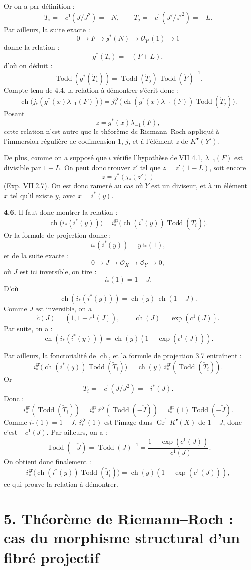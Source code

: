 \documentclass[11pt]{article}
\newcommand{\Gr}{\operatorname{Gr}}
\newcommand{\ch}{\operatorname{ch}}
\newcommand{\Todd}{\operatorname{Todd}}
\providecommand{\ch}{\operatorname{ch}}
\providecommand{\Todd}{\operatorname{Todd}}
\providecommand{\Gr}{\operatorname{Gr}}
\providecommand{\Gr}{\operatorname{G}}
\begin{document}
Or on a par définition :
\[
 T_i=-c^1(J/J^2)=-N,\qquad
 T_j=-c^1(J'/J'^2)=-L.
\]
Par ailleurs, la suite exacte :
\[
0\longrightarrow F\longrightarrow g^*(N)\longrightarrow \mathcal O_{Y'}(1)\longrightarrow0
\]
donne la relation :
\[
 g^*(T_i)=-(F+L),
\]
d'où on déduit :
\[
 \Todd(g^*(\check T_i))=\Todd(\check T_j)\Todd(\check F)^{-1}.
\]
Compte tenu de 4.4, la relation à démontrer s'écrit donc :
\[
 \ch\bigl(j_*(g^*(x)\lambda_{-1}(F))\bigr)
 =
 j^{\mathrm{gr}}_*\bigl(\ch(g^*(x)\lambda_{-1}(F))\Todd(\check T_j)\bigr).
\]
Posant
\[
z=g^*(x)\lambda_{-1}(F),
\]
cette relation n'est autre que le théorème de Riemann--Roch appliqué à l'immersion régulière de codimension \(1\), \(j\), et à l'élément \(z\) de \(K^{\bullet}(Y')\).

De plus, comme on a supposé que \(i\) vérifie l'hypothèse de VII 4.1, \(\lambda_{-1}(F)\) est divisible par \(1-L\). On peut donc trouver \(z'\) tel que \(z=z'(1-L)\), soit encore
\[
 z=j^*(j_*(z'))
\]
(Exp. VII 2.7). On est donc ramené au cas où \(Y\) est un diviseur, et à un élément \(x\) tel qu'il existe \(y\), avec \(x=i^*(y)\).

\textbf{4.6.} Il faut donc montrer la relation :
\[
 \ch\bigl(i_*(i^*(y))\bigr)
 =
 i^{\mathrm{gr}}_*\bigl(\ch(i^*(y))\Todd(\check T_i)\bigr).
\]
Or la formule de projection donne :
\[
 i_*(i^*(y))=y\,i_*(1),
\]
et de la suite exacte :
\[
0\longrightarrow J\longrightarrow\mathcal O_X\longrightarrow\mathcal O_Y\longrightarrow0,
\]
où \(J\) est ici inversible, on tire :
\[
 i_*(1)=1-J.
\]
D'où
\[
 \ch(i_*(i^*(y)))=\ch(y)\,\ch(1-J).
\]
Comme \(J\) est inversible, on a
\[
 \widetilde c(J)=(1,1+c^1(J)),\qquad \ch(J)=\exp(c^1(J)).
\]
Par suite, on a :
\[
 \ch(i_*(i^*(y)))=\ch(y)(1-\exp(c^1(J))).
\]

Par ailleurs, la fonctorialité de \(\ch\), et la formule de projection 3.7 entraînent :
\[
 i^{\mathrm{gr}}_*\bigl(\ch(i^*(y))\Todd(\check T_i)\bigr)
 =
 \ch(y)\,i^{\mathrm{gr}}_*(\Todd(\check T_i)).
\]
Or
\[
T_i=-c^1(J/J^2)=-i^*(J).
\]
Donc :
\[
 i^{\mathrm{gr}}_*(\Todd(\check T_i))
 =
 i^{\mathrm{gr}}_*\,i^{\mathrm{gr}}(\Todd(-\check J))
 =
 i^{\mathrm{gr}}_*(1)\Todd(-\check J).
\]
Comme \(i_*(1)=1-J\), \(i^{\mathrm{gr}}_*(1)\) est l'image dans \(\Gr^1K^{\bullet}(X)\) de \(1-J\), donc c'est \(-c^1(J)\). Par ailleurs, on a :
\[
 \Todd(-\check J)=\Todd(J)^{-1}
 =
 \frac{1-\exp(c^1(J))}{-c^1(J)}.
\]
On obtient donc finalement :
\[
 i^{\mathrm{gr}}_*\bigl(\ch(i^*(y))\Todd(\check T_i)\bigr)
 =
 \ch(y)(1-\exp(c^1(J))),
\]
ce qui prouve la relation à démontrer.

\section*{5. Théorème de Riemann--Roch : cas du morphisme structural d'un fibré projectif}
\end{document}
